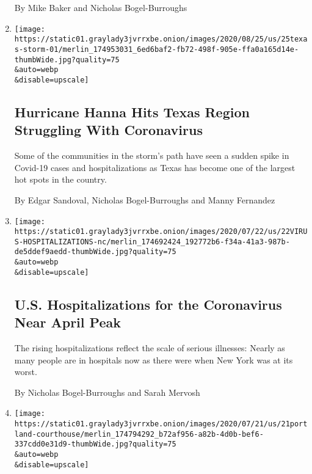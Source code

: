\begin{enumerate}
  By Mike Baker and Nicholas Bogel-Burroughs
\item
  \href{/2020/07/25/us/hanna-storm-texas.html}{}

  \texttt{[image: https://static01.graylady3jvrrxbe.onion/images/2020/08/25/us/25texas-storm-01/merlin\_174953031\_6ed6baf2-fb72-498f-905e-ffa0a165d14e-thumbWide.jpg?quality=75\\\&auto=webp\\\&disable=upscale]}

  \hypertarget{hurricane-hanna-hits-texas-region-struggling-with-coronavirus}{%
  \subsection{Hurricane Hanna Hits Texas Region Struggling With
  Coronavirus}\label{hurricane-hanna-hits-texas-region-struggling-with-coronavirus}}

  Some of the communities in the storm's path have seen a sudden spike
  in Covid-19 cases and hospitalizations as Texas has become one of the
  largest hot spots in the country.

  By Edgar Sandoval, Nicholas Bogel-Burroughs and Manny Fernandez
\item
  \href{/2020/07/22/us/coronavirus-hospitalizations-near-peak.html}{}

  \texttt{[image: https://static01.graylady3jvrrxbe.onion/images/2020/07/22/us/22VIRUS-HOSPITALIZATIONS-nc/merlin\_174692424\_192772b6-f34a-41a3-987b-de5ddef9aedd-thumbWide.jpg?quality=75\\\&auto=webp\\\&disable=upscale]}

  \hypertarget{us-hospitalizations-for-the-coronavirus-near-april-peak}{%
  \subsection{U.S. Hospitalizations for the Coronavirus Near April
  Peak}\label{us-hospitalizations-for-the-coronavirus-near-april-peak}}

  The rising hospitalizations reflect the scale of serious illnesses:
  Nearly as many people are in hospitals now as there were when New York
  was at its worst.

  By Nicholas Bogel-Burroughs and Sarah Mervosh
\item
  \href{/2020/07/22/us/portland-protests-courthouse.html}{}

  \texttt{[image: https://static01.graylady3jvrrxbe.onion/images/2020/07/21/us/21portland-courthouse/merlin\_174794292\_b72af956-a82b-4d0b-bef6-337cdd0e31d9-thumbWide.jpg?quality=75\\\&auto=webp\\\&disable=upscale]}


\end{enumerate}
